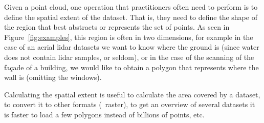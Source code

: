 Given a point cloud, one operation that practitioners often need to perform is to define the spatial extent of the dataset.
That is, they need to define the shape of the region that best abstracts or represents the set of points.
As seen in Figure~\ref{fig:examples}, this region is often in two dimensions, for example in the case of an aerial lidar datasets we want to know where the ground is (since water does not contain lidar samples, or seldom), or in the case of the scanning of the façade of a building, we would like to obtain a polygon that represents where the wall is (omitting the windows).

%

Calculating the spatial extent is useful to calculate the area covered by a dataset, to convert it to other formats (\eg\ raster), to get an overview of several datasets it is faster to load a few polygons instead of billions of points, etc.

%

